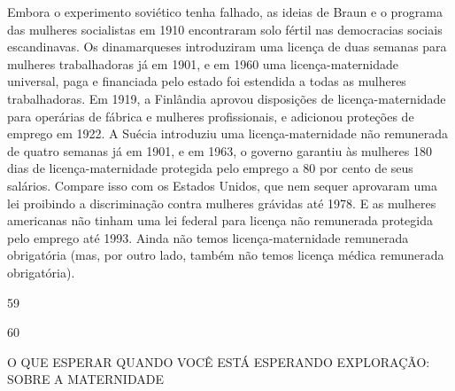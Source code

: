  \par 
Embora o experimento soviético tenha falhado, as ideias de Braun e o programa das mulheres socialistas em 1910 encontraram solo fértil nas democracias sociais escandinavas. Os dinamarqueses introduziram uma licença de duas semanas para mulheres trabalhadoras já em 1901, e em 1960 uma licença-maternidade universal, paga e financiada pelo estado foi estendida a todas as mulheres trabalhadoras. Em 1919, a Finlândia aprovou disposições de licença-maternidade para operárias de fábrica e mulheres profissionais, e adicionou proteções de emprego em 1922. A Suécia introduziu uma licença-maternidade não remunerada de quatro semanas já em 1901, e em 1963, o governo garantiu às mulheres {\color{blue}180} dias de licença-maternidade protegida pelo emprego a {\color{blue}80} por cento de seus salários. Compare isso com os Estados Unidos, que nem sequer aprovaram uma lei proibindo a discriminação contra mulheres grávidas até 1978. E as mulheres americanas não tinham uma lei federal para licença não remunerada protegida pelo emprego até 1993. Ainda não temos licença-maternidade remunerada obrigatória (mas, por outro lado, também não temos licença médica remunerada obrigatória).
 \par 
59
 \par 
60
 \par 
O QUE ESPERAR QUANDO VOCÊ ESTÁ ESPERANDO EXPLORAÇÃO: SOBRE A MATERNIDADE
 \par 
